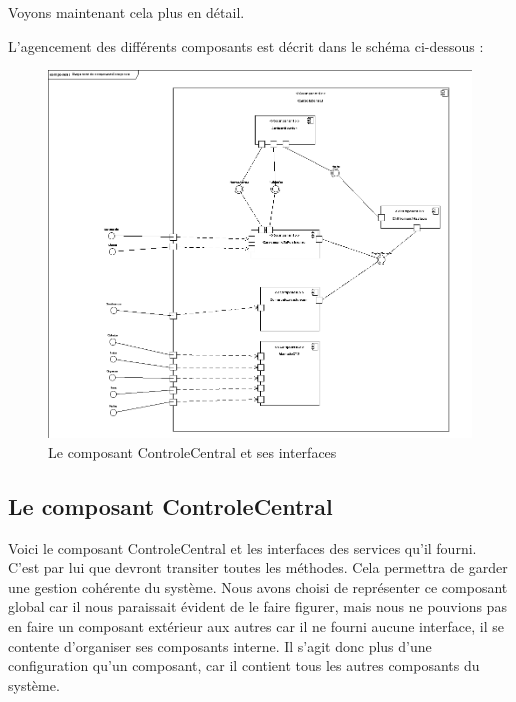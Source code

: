 Voyons maintenant cela plus en détail.


L'agencement des différents composants est décrit dans le schéma ci-dessous : 

\begin{figure}[htbp]
	\centering
		\includegraphics[width=15cm]{images/L3/composants.png}
	\caption{Le composant ControleCentral et ses interfaces}
	\label{fig:ControleCentral}
\end{figure}


\subsection{Le composant ControleCentral}

Voici le composant ControleCentral et les interfaces des services qu'il fourni.
C'est par lui que devront transiter toutes les méthodes.
Cela permettra de garder une gestion cohérente du système. %
Nous avons choisi de représenter ce composant global car il nous paraissait évident de le faire figurer, mais nous ne pouvions pas en faire un composant extérieur aux autres car il ne fourni aucune interface, il se contente d'organiser ses composants interne.
Il s'agit donc plus d'une configuration qu'un composant, car il contient tous les autres composants du système.

